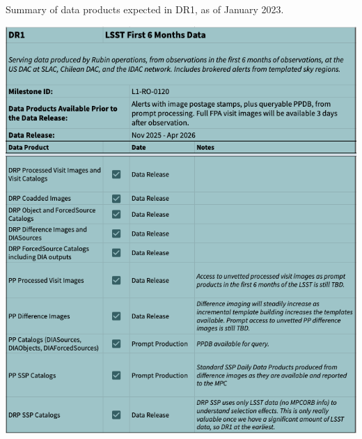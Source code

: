 \begin{table}[ht]
\centering
\caption{Summary of data products expected in DR1, as of January 2023.}
\label{tab:dr-one-products}
\includegraphics[width=0.9\linewidth]{figures/DR1-products}
\end{table}

\clearpage
